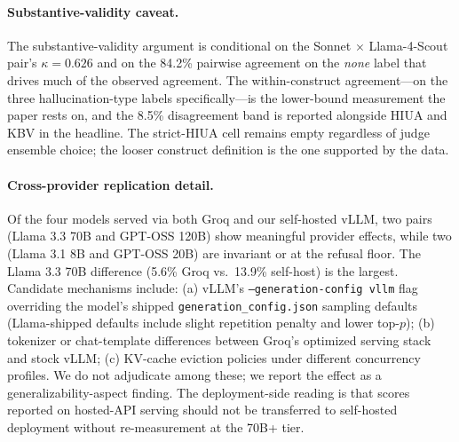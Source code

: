 \paragraph{Substantive-validity caveat.}
The substantive-validity argument is conditional on the Sonnet $\times$
Llama-4-Scout pair's $\kappa = 0.626$ and on the 84.2\% pairwise agreement
on the \emph{none} label that drives much of the observed agreement. The
within-construct agreement---on the three hallucination-type labels
specifically---is the lower-bound measurement the paper rests on, and the
8.5\% disagreement band is reported alongside HIUA and KBV in the headline.
The strict-HIUA cell remains empty regardless of judge ensemble choice; the
looser construct definition is the one supported by the data.

\paragraph{Cross-provider replication detail.}
Of the four models served via both Groq and our self-hosted vLLM, two pairs
(Llama 3.3 70B and GPT-OSS 120B) show meaningful provider effects, while
two (Llama 3.1 8B and GPT-OSS 20B) are invariant or at the refusal floor.
The Llama 3.3 70B difference (5.6\% Groq vs.\ 13.9\% self-host) is the
largest. Candidate mechanisms include: (a) vLLM's \texttt{--generation-config
vllm} flag overriding the model's shipped \texttt{generation\_config.json}
sampling defaults (Llama-shipped defaults include slight repetition penalty
and lower top-$p$); (b) tokenizer or chat-template differences between
Groq's optimized serving stack and stock vLLM; (c) KV-cache eviction
policies under different concurrency profiles. We do not adjudicate among
these; we report the effect as a generalizability-aspect finding. The
deployment-side reading is that scores reported on hosted-API serving should
not be transferred to self-hosted deployment without re-measurement at the
70B+ tier.
